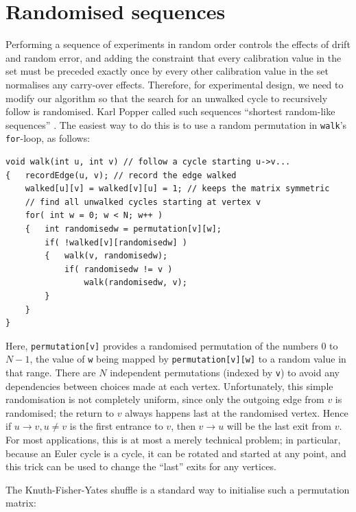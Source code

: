 \documentclass[12pt]{article}
\begin{document}
\section{Randomised sequences}\label{randomise}

Performing a sequence of experiments in random order controls the effects of drift and random error, and adding the constraint that every calibration value in the set must be preceded exactly once by every other calibration value in the set normalises any carry-over effects. Therefore, for experimental design, we need to modify our algorithm so that the search for an unwalked cycle to recursively follow is randomised. Karl Popper called such sequences ``shortest random-like sequences'' \cite{popper}. The easiest way to do this is to use a random permutation in \texttt{walk}'s \texttt{for}-loop, as follows:

\begin{verbatim}
void walk(int u, int v) // follow a cycle starting u->v...
{   recordEdge(u, v); // record the edge walked
    walked[u][v] = walked[v][u] = 1; // keeps the matrix symmetric
    // find all unwalked cycles starting at vertex v
    for( int w = 0; w < N; w++ )
    {   int randomisedw = permutation[v][w];
        if( !walked[v][randomisedw] )
        {   walk(v, randomisedw);
            if( randomisedw != v )
                walk(randomisedw, v);
        }
    }
}
\end{verbatim}

Here, \texttt{permutation[v]} provides a randomised permutation of the numbers $0$ to $N-1$, the value of \texttt{w} being mapped by \texttt{permutation[v][w]} to a random value in that range. 
There are $N$ independent permutations (indexed by \texttt{v}) to avoid any dependencies between choices made at each vertex.  Unfortunately, this simple randomisation is not completely uniform, since only the outgoing edge from $v$ is randomised; the return to $v$ always happens last at the randomised vertex. Hence if $u\rightarrow v, u \neq v$ is the first entrance to $v$, then $v \rightarrow u$ will be the last exit from $v$. For most applications, this is at most a merely technical problem; in particular, because an Euler cycle is a cycle, it can be rotated and started at any point, and this trick can be used to change the ``last'' exits for any vertices.

The Knuth-Fisher-Yates shuffle \cite[p145--146]{knuth2} is a standard way to initialise such a permutation matrix:
\end{document}
